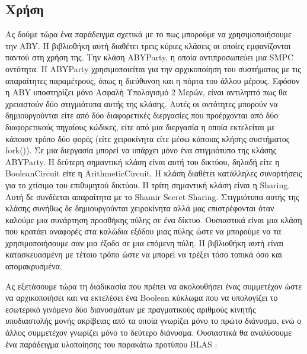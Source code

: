 \subsection{Χρήση}

Ας δούμε τώρα ένα παράδειγμα σχετικά με το πως μπορούμε να χρησιμοποιήσουμε την ABY. Η βιβλιοθήκη αυτή διαθέτει τρεις κύριες κλάσεις οι οποίες εμφανίζονται παντού στη χρήση της. Την κλάση ABYParty, η οποία αντιπροσωπεύει μια SMPC οντότητα. Η ABYParty χρησιμοποιείται για την αρχικοποίηση του συστήματος με τις απαραίτητες παραμέτρους, όπως η διεύθυνση και η πόρτα του άλλου μέρους. Εφόσον η ABY υποστηρίζει μόνο Ασφαλή Υπολογισμό 2 Μερών, είναι αντιληπτό πως θα χρειαστούν δύο στιγμιότυπα αυτής της κλάσης. Αυτές οι οντότητες μπορούν να δημιουργούνται είτε από δύο διαφορετικές διεργασίες που προέρχονται από δύο διαφορετικούς πηγαίους κώδικες, είτε από μια διεργασία η οποία εκτελείται με κάποιον τρόπο δύο φορές (είτε χειροκίνητα είτε μέσω κάποιας κλήσης συστήματος fork()). Σε μια διεργασία μπορεί να υπάρχει μόνο ένα στιγμιότυπο της κλάσης ABYParty. Η δεύτερη σημαντική κλάση είναι αυτή του δικτύου, δηλαδή είτε η BooleanCircuit είτε η ArithmeticCircuit. Η κλάση διαθέτει κατάλληλες συναρτήσεις για το χτίσιμο του επιθυμητού δικτύου. Η τρίτη σημαντική κλάση είναι η Sharing. Αυτή δε συνδέεται απαραίτητα με το Shamir Secret Sharing. Στιγμιότυπα αυτής της κλάσης συνήθως δε δημιουργούνται χειροκίνητα αλλά μας επιστρέφονται όταν καλούμε μια συνάρτηση προσθήκης πύλης σε ένα δίκτυο. Ουσιαστικά είναι μια κλάση που κρατάει αναφορές στα καλώδια εξόδου μιας πύλης ώστε να μπορούμε να τα χρησιμοποιήσουμε σαν μια έξοδο σε μια επόμενη πύλη. Η βιβλιοθήκη αυτή είναι κατασκευασμένη με τέτοιο τρόπο ώστε να μπορεί να τρέξει τόσο τοπικά όσο και απομακρυσμένα.

Ας εξετάσουμε τώρα τη διαδικασία που πρέπει να ακολουθήσει ένας συμμετέχον ώστε να αρχικοποιήσει και να εκτελέσει ένα Boolean κύκλωμα που να υπολογίζει το εσωτερικό γινόμενο δύο διανυσμάτων με πραγματικούς αριθμούς κινητής υποδιαστολής μονής ακρίβειας από τα οποία γνωρίζει μόνο το πρώτο διάνυσμα, ενώ ο άλλος συμμετέχον γνωρίζει μόνο το δεύτερο διάνυσμα. Ουσιαστικά θα αναλύσουμε ένα παράδειγμα υλοποίησης του παρακάτω προτύπου BLAS :

\begin{figure}[h!]
    \begin{center}
        \inputminted[fontsize=\scriptsize,frame=single]{cpp}{./01_body/code/aby-example-step-0.cpp}
    \end{center}
\end{figure}

